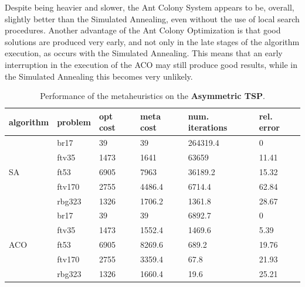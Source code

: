 Despite being heavier and slower, the Ant Colony System appears to be, overall, slightly better than the Simulated Annealing, even without the use of local search procedures. Another advantage of the Ant Colony Optimization is that good solutions are produced very early, and not only in the late stages of the algorithm execution, as occurs with the Simulated Annealing. This means that an early interruption in the execution of the ACO may still produce good results, while in the Simulated Annealing this becomes very unlikely. 

\begin{table}[t]
\centering
\caption{Performance of the metaheuristics on the \textbf{Asymmetric TSP}.}
\label{tab:tsp_results}
\begin{tabular}{|l|l|l|l|l|l|}
\hline
algorithm            & problem & opt cost & meta cost & num. iterations & rel. error \\ \hline
\multirow{5}{*}{SA}  & br17    & 39       & 39        & 264319.4        & 0          \\ \cline{2-6} 
                     & ftv35   & 1473     & 1641      & 63659           & 11.41      \\ \cline{2-6} 
                     & ft53    & 6905     & 7963      & 36189.2         & 15.32      \\ \cline{2-6} 
                     & ftv170  & 2755     & 4486.4    & 6714.4          & 62.84     \\ \cline{2-6} 
                     & rbg323  & 1326     & 1706.2    & 1361.8          & 28.67      \\ \hline
\multirow{5}{*}{ACO} & br17    & 39       & 39        & 6892.7          & 0          \\ \cline{2-6} 
                     & ftv35   & 1473     & 1552.4    & 1469.6          & 5.39       \\ \cline{2-6} 
                     & ft53    & 6905     & 8269.6    & 689.2           & 19.76      \\ \cline{2-6} 
                     & ftv170  & 2755     & 3359.4    & 67.8            & 21.93      \\ \cline{2-6} 
                     & rbg323  & 1326     & 1660.4    & 19.6            & 25.21      \\ \hline
\end{tabular}
\end{table}


